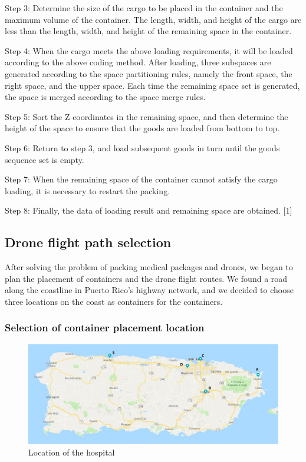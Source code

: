 \documentclass{article} %
\begin{document}
Step 3: Determine the size of the cargo to be placed in the container and the maximum volume of the container. The length, width, and height of the cargo are less than the length, width, and height of the remaining space in the container.

Step 4: When the cargo meets the above loading requirements, it will be loaded according to the above coding method. After loading, three subspaces are generated according to the space partitioning rules, namely the front space, the right space, and the upper space. Each time the remaining space set is generated, the space is merged according to the space merge rules.

Step 5: Sort the Z coordinates in the remaining space, and then determine the height of the space to ensure that the goods are loaded from bottom to top.

Step 6: Return to step 3, and load subsequent goods in turn until the goods sequence set is empty.

Step 7: When the remaining space of the container cannot satisfy the cargo loading, it is necessary to restart the packing.

Step 8: Finally, the data of loading result and remaining space are obtained. [1]

\subsection{Drone flight path selection}
After solving the problem of packing medical packages and drones, we began to plan the placement of containers and the drone flight routes.
We found a road along the coastline in Puerto Rico's highway network, and we decided to choose three locations on the coast as containers for the containers.
\subsubsection{Selection of container placement location}


\begin{figure}[h]
    \centering
    \includegraphics[scale=0.2]{3.jpg}
    \caption{Location of the hospital}
\end{figure}
\end{document}

